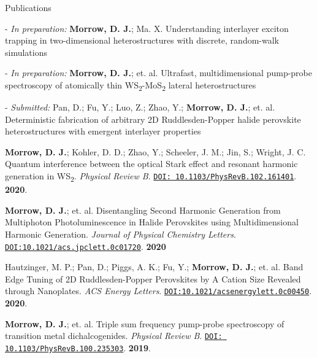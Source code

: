 \documentclass{resume} %
\begin{document}
\begin{rSection}{Publications}
	
\begin{etaremune}[topsep=0pt,itemsep=0pt,partopsep=0pt,parsep=0pt]

\item[-] \textit{In preparation:} \textbf{Morrow, D. J.}; Ma. X. Understanding interlayer exciton trapping in two-dimensional heterostructures with discrete, random-walk simulations

\item[-] \textit{In preparation:} \textbf{Morrow, D. J.}; et. al. Ultrafast, multidimensional pump-probe spectroscopy of atomically thin WS\textsubscript{2}-MoS\textsubscript{2} lateral heterostructures

\item[-] \textit{Submitted:} Pan, D.; Fu, Y.; Luo, Z.; Zhao, Y.; \textbf{Morrow, D. J.}; et. al. Deterministic fabrication of arbitrary 2D Ruddlesden-Popper halide perovskite heterostructures with emergent interlayer properties


\item \textbf{Morrow, D. J.}; Kohler, D. D.; Zhao, Y.; Scheeler, J. M.; Jin, S.; Wright, J. C.	Quantum interference between the optical Stark effect and resonant harmonic generation in WS\textsubscript{2}.  \emph{Physical Review B}. \href{https://journals.aps.org/pra/abstract/10.1103/PhysRevB.102.161401}{\texttt{DOI: 10.1103/PhysRevB.102.161401}}. \textbf{2020}.

\item \textbf{Morrow, D. J.}; et. al. Disentangling Second Harmonic Generation from Multiphoton Photoluminescence in Halide Perovskites using Multidimensional Harmonic Generation. \emph{Journal of Physical Chemistry Letters}. \href{https://pubs.acs.org/doi/10.1021/acs.jpclett.0c01720}{\texttt{DOI:10.1021/acs.jpclett.0c01720}}. \textbf{2020}

\item Hautzinger, M. P.; Pan, D.; Piggs, A. K.; Fu, Y.; \textbf{Morrow, D. J.}; et. al. Band Edge Tuning of 2D Ruddlesden-Popper Perovskites by A Cation Size Revealed through Nanoplates. \emph{ACS Energy Letters}. \href{https://pubs.acs.org/doi/10.1021/acsenergylett.0c00450}{\texttt{DOI:10.1021/acsenergylett.0c00450}}. \textbf{2020}. 

\item  \textbf{Morrow, D. J.}; et. al. Triple sum frequency pump-probe spectroscopy of transition metal dichalcogenides. \emph{Physical Review B}. \href{https://journals.aps.org/pra/abstract/10.1103/PhysRevB.100.235303}{\texttt{DOI: 10.1103/PhysRevB.100.235303}}. \textbf{2019}.


\end{etaremune}
\end{rSection}
\end{document}
